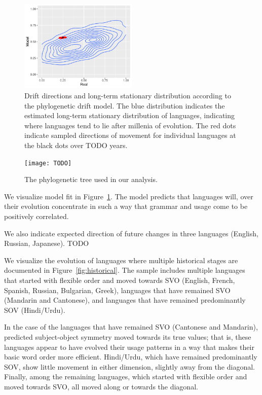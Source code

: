 \documentclass[11pt,a4paper]{article}
\begin{document}
\begin{figure}
    \centering
    \includegraphics[width=0.5\textwidth]{change/visualize/stationary.pdf}
    \caption{Drift directions and long-term stationary distribution according to the phylogenetic drift model.
    The blue distribution indicates the estimated long-term stationary distribution of languages, indicating where languages tend to lie after millenia of evolution.
    The red dots indicate sampled directions of movement for individual languages at the black dots over TODO years.}
    \label{fig:drift-model}
\end{figure}

\begin{figure}
    \centering
    \texttt{[image: TODO]}
    \caption{The phylogenetic tree used in our analysis.}
    \label{fig:phylogenetic-tree}
\end{figure}

We visualize model fit in Figure~\ref{fig:drift-model}.
The model predicts that languages will, over their evolution concentrate in such a way that grammar and usage come to be positively correlated.

We also indicate expected direction of future changes in three languages (English, Russian, Japanese). TODO

We visualize the evolution of languages where multiple historical stages are documented in Figure~\ref{fig:historical}.
The sample includes multiple languages that started with flexible order and moved towards SVO (English, French, Spanish, Russian, Bulgarian, Greek), languages that have remained SVO (Mandarin and Cantonese), and languages that have remained predominantly SOV (Hindi/Urdu).

In the case of the languages that have remained SVO (Cantonese and Mandarin), predicted subject-object symmetry moved towards its true values; that is, these languages appear to have evolved their usage patterns in a way that makes their basic word order more efficient.
Hindi/Urdu, which have remained predominantly SOV, show little movement in either dimension, slightly away from the diagonal.
Finally, among the remaining languages, which started with flexible order and moved towards SVO, all moved along or towards the diagonal.
\end{document}

